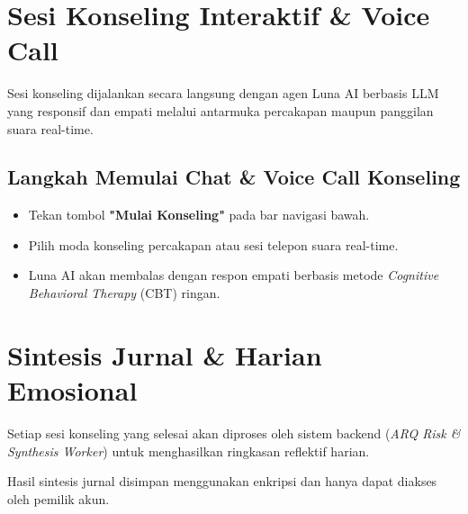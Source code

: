 \section{Sesi Konseling Interaktif \& Voice Call}
Sesi konseling dijalankan secara langsung dengan agen Luna AI berbasis LLM yang responsif dan empati melalui antarmuka percakapan maupun panggilan suara real-time.

\subsection{Langkah Memulai Chat \& Voice Call Konseling}
\begin{itemize}
    \item Tekan tombol \textbf{"Mulai Konseling"} pada bar navigasi bawah.
    \item Pilih moda konseling percakapan atau sesi telepon suara real-time.
    \item Luna AI akan membalas dengan respon empati berbasis metode \textit{Cognitive Behavioral Therapy} (CBT) ringan.
\end{itemize}




\section{Sintesis Jurnal \& Harian Emosional}
Setiap sesi konseling yang selesai akan diproses oleh sistem backend (\textit{ARQ Risk \& Synthesis Worker}) untuk menghasilkan ringkasan reflektif harian.



\begin{lunawarning}
Hasil sintesis jurnal disimpan menggunakan enkripsi dan hanya dapat diakses oleh pemilik akun.
\end{lunawarning}
